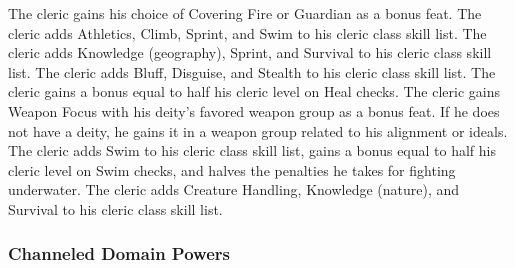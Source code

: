 The cleric gains his choice of Covering Fire or Guardian as a bonus feat.
The cleric adds Athletics, Climb, Sprint, and Swim to his cleric class skill list.
The cleric adds Knowledge (geography), Sprint, and Survival to his cleric class skill list.
The cleric adds Bluff, Disguise, and Stealth to his cleric class skill list.
The cleric gains a bonus equal to half his cleric level on Heal checks.
The cleric gains Weapon Focus with his deity's favored weapon group as a bonus feat.
If he does not have a deity, he gains it in a weapon group related to his alignment or ideals.
The cleric adds Swim to his cleric class skill list, gains a bonus equal to half his cleric level on Swim checks, and halves the penalties he takes for fighting underwater.
The cleric adds Creature Handling, Knowledge (nature), and Survival to his cleric class skill list.

\subsubsection{Channeled Domain Powers}\label{Channeled Domain Powers}

